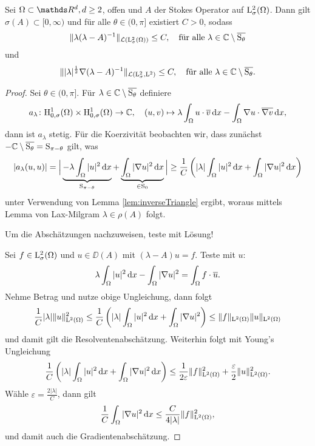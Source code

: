 \begin{prop}
  Sei $\Omega \subset \R^d, d\geq2$, offen und $A$ der Stokes Operator auf $\mathrm{L}^2_\sigma(\Omega)$. Dann gilt $\sigma(A) \subset [0,\infty)$ und für alle $\theta \in (0,\pi]$ existiert $C > 0$, sodass
  $$
  \| \lambda (\lambda - A)^{-1}\|_{\mathcal{L}(\mathrm{L}^2_\sigma(\Omega))} \leq C, \quad\text{für alle } \lambda \in \mathbb{C} \setminus \overline{\mathrm{S}_\theta}
  $$
  und
  $$
  \| |\lambda|^{\frac{1}{2}} \nabla (\lambda - A)^{-1} \|_{\mathcal{L}(\mathrm{L}_\sigma^2, \mathrm{L}^2)} \leq C, \quad\text{für alle } \lambda \in \mathbb{C} \setminus \overline{\mathrm{S}_\theta}.
  $$
\end{prop}

\begin{proof}
  Sei $\theta \in (0,\pi]$. 
  Für $\lambda \in \mathbb{C} \setminus \overline{\mathrm{S}_\theta}$ definiere
  $$
  a_\lambda \colon \mathrm{H}_{0,\sigma}^1(\Omega) \times \mathrm{H}_{0,\sigma}^1(\Omega) \to \mathbb{C}, \quad (u,v) \mapsto \lambda \int_\Omega u \cdot \overline v \, {\operatorname{d}\!{x}} - \int_\Omega \nabla u \cdot \overline{\nabla v} \, {\operatorname{d}\!{x}},
  $$
  dann ist $a_\lambda$ stetig.
  Für die Koerzivität beobachten wir, dass zunächst $- \mathbb{C} \setminus \overline{\mathrm{S}_\theta} = \mathrm{S}_{\pi - \theta}$ gilt, was
  $$
  |a_\lambda(u,u)| 
  = \Big| \underbrace{- \lambda\int_\Omega |u|^2 \, {\operatorname{d}\!{x}}}_{\mathrm{S}_{\pi - \theta}} + \underbrace{\int_\Omega |\nabla u|^2 \, {\operatorname{d}\!{x}}}_{\in \mathrm{S}_0} \Big| 
  \geq \frac{1}{C} \left( |\lambda| \int_\Omega |u|^2 \, {\operatorname{d}\!{x}} + \int_\Omega |\nabla u|^2 \, {\operatorname{d}\!{x}}\right)
  $$
  unter Verwendung von Lemma \ref{lem:inverseTriangle} ergibt, woraus mittels Lemma von Lax-Milgram $\lambda \in \rho(A)$ folgt.
  
  Um die Abschätzungen nachzuweisen, teste mit Lösung!

  Sei $f \in \mathrm{L}_\sigma^2(\Omega)$ und $u \in \DD(A)$ mit $(\lambda - A) u = f$.
  Teste mit $u$:
  $$
  \lambda \int_\Omega |u|^2 \, {\operatorname{d}\!{x}} - \int_\Omega |\nabla u|^2 = \int_\Omega f \cdot \overline u.
  $$
  Nehme Betrag und nutze obige Ungleichung, dann folgt
  $$
  \frac{1}{C} |\lambda|\|u\|_{\mathrm{L}^2(\Omega)}^2 
  \leq \frac{1}{C} \left(|\lambda| \int_\Omega |u|^2 \, {\operatorname{d}\!{x}} + \int_\Omega |\nabla u|^2\right) 
  \leq \|f\|_{\mathrm{L}^2(\Omega)} \|u\|_{\mathrm{L}^2(\Omega)}
  $$
  und damit gilt die Resolventenabschätzung.
  Weiterhin folgt mit Young's Ungleichung
  $$
  \frac{1}{C} \left(|\lambda| \int_\Omega |u|^2 \, {\operatorname{d}\!{x}} + \int_\Omega |\nabla u|^2 \, {\operatorname{d}\!{x}} \right)
  \leq \frac{1}{2\varepsilon} \|f\|_{\mathrm{L}^2(\Omega)}^2 + \frac{\varepsilon}{2} \|u\|_{\mathrm{L}^2(\Omega)}^2.
  $$
  Wähle $\varepsilon = \frac{2| \lambda|}{C}$, dann gilt
  $$
  \frac{1}{C} \int_\Omega |\nabla u|^2 \, {\operatorname{d}\!{x}} \leq \frac{C}{4|\lambda|} \|f \|_{\mathrm{L}^2(\Omega)}^2,
  $$
  und damit auch die Gradientenabschätzung.
\end{proof}

